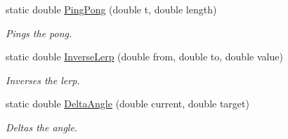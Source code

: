\begin{DoxyCompactItemize}
static double \hyperlink{struct_unity_engine_1_1_mathd_a515cd152eb38793dbd728719f51a034b}{Ping\+Pong} (double t, double length)
\begin{DoxyCompactList}\small\item\em Pings the pong. \end{DoxyCompactList}\item 
static double \hyperlink{struct_unity_engine_1_1_mathd_a6cc9def8a4d9ce439d331a6d91f2ea80}{Inverse\+Lerp} (double from, double to, double value)
\begin{DoxyCompactList}\small\item\em Inverses the lerp. \end{DoxyCompactList}\item 
static double \hyperlink{struct_unity_engine_1_1_mathd_ab4a58f606d08c3756e70966e7d3be0e9}{Delta\+Angle} (double current, double target)
\begin{DoxyCompactList}\small\item\em Deltas the angle. \end{DoxyCompactList}\end{DoxyCompactItemize}
